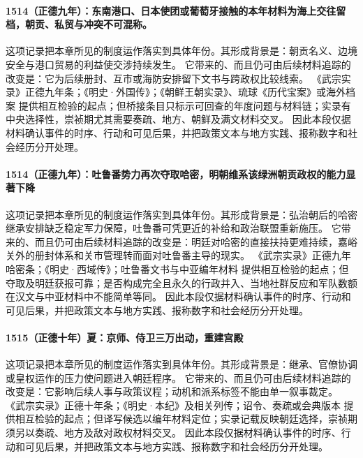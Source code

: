 \paragraph{1514（正德九年）：东南港口、日本使团或葡萄牙接触的本年材料为海上交往留档，朝贡、私贸与冲突不可混称。} 这项记录把本章所见的制度运作落实到具体年份。其形成背景是：朝贡名义、边境安全与港口贸易的利益使交涉持续发生。 它带来的、而且仍可由后续材料追踪的改变是：它为后续册封、互市或海防安排留下文书与跨政权比较线索。 《武宗实录》正德九年条；《明史·外国传》；《朝鲜王朝实录》、琉球《历代宝案》或海外档案 提供相互检验的起点；但桥接条目只标示可回查的年度问题与材料链；实录有中央选择性，崇祯期尤其需要奏疏、地方、朝鲜及满文材料交叉。 因此本段仅据材料确认事件的时序、行动和可见后果，并把政策文本与地方实践、报称数字和社会经历分开处理。

\paragraph{1514（正德九年）：吐鲁番势力再次夺取哈密，明朝维系该绿洲朝贡政权的能力显著下降} 这项记录把本章所见的制度运作落实到具体年份。其形成背景是：弘治朝后的哈密继承安排缺乏稳定军力保障，吐鲁番可凭更近的补给和政治联盟重新施压。 它带来的、而且仍可由后续材料追踪的改变是：明廷对哈密的直接扶持更难持续，嘉峪关外的册封体系和关市管理转而面对吐鲁番主导的现实。 《武宗实录》正德九年哈密条；《明史·西域传》；吐鲁番文书与中亚编年材料 提供相互检验的起点；但夺取及明廷获报可靠；是否构成完全且永久的行政并入、当地社群反应和军队数额在汉文与中亚材料中不能简单等同。 因此本段仅据材料确认事件的时序、行动和可见后果，并把政策文本与地方实践、报称数字和社会经历分开处理。

\paragraph{1515（正德十年）夏：京师、侍卫三万出动，重建宫殿} 这项记录把本章所见的制度运作落实到具体年份。其形成背景是：继承、官僚协调或皇权运作的压力使问题进入朝廷程序。 它带来的、而且仍可由后续材料追踪的改变是：它影响后续人事与政策议程；动机和派系标签不能由单一叙事裁定。 《武宗实录》正德十年条；《明史·本纪》及相关列传；诏令、奏疏或会典版本 提供相互检验的起点；但译写候选以编年材料定位；实录记载反映朝廷选择，崇祯期须另以奏疏、地方及敌对政权材料交叉。 因此本段仅据材料确认事件的时序、行动和可见后果，并把政策文本与地方实践、报称数字和社会经历分开处理。

